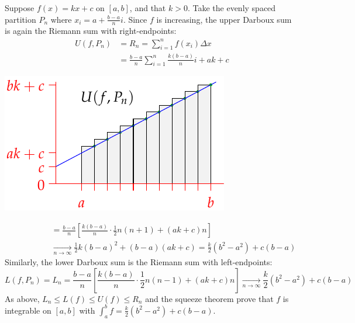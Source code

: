 \begin{examples}{}{}
\begin{enumerate}
		\begin{minipage}[t]{0.58\linewidth}\vspace{0pt}
			\item Suppose $f(x)=kx+c$ on $[a,b]$, and that $k>0$. Take the evenly spaced partition $P_n$ where $x_i=a+\frac{b-a}ni$. Since $f$ is increasing, the upper Darboux sum is again the Riemann sum with right-endpoints:
			\begin{align*}
				U(f,P_n)
				&=R_n=\sum_{i=1}^nf(x_i)\Delta x\\
				&=\frac{b-a}n\sum_{i=1}^n\frac{k(b-a)}ni+ak+c
			\end{align*}
		\end{minipage}
		\hfill
		\begin{minipage}[t]{0.4\linewidth}\vspace{0pt}
			\flushright\includegraphics[scale=0.95]{darboux-triangle}
		\end{minipage}\vspace{-5pt}
  
		\begin{align*}
			\phantom{U(f,P_n)}
			&=\frac{b-a}n\left[\frac{k(b-a)}n\cdot \frac 12n(n+1)+(ak+c)n\right]\\
			&\xrightarrow[n\to\infty]{} \frac 12k(b-a)^2+(b-a)(ak+c)
				=\frac k2(b^2-a^2)+c(b-a)
		\end{align*}
		Similarly, the lower Darboux sum is the Riemann sum with left-endpoints:
		\[
			L(f,P_n)=L_n
			=\frac{b-a}n\left[\frac{k(b-a)}n\cdot \frac 12n(n-1)+(ak+c)n\right] 
			\xrightarrow[n\to\infty]{} \frac k2(b^2-a^2)+c(b-a)
		\]
		As above, $L_n\le L(f)\le U(f)\le R_n$ and the squeeze theorem prove that $f$ is integrable on $[a,b]$ with $\int_a^bf=\frac k2(b^2-a^2)+c(b-a)$. 
	\end{enumerate}
\end{examples}

\goodbreak


